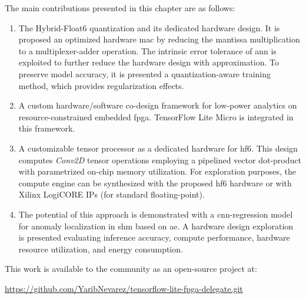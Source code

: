 The main contributions presented in this chapter are as follows:
\begin{enumerate}
	\item
	
	The Hybrid-Float6 quantization and its dedicated hardware design. It is proposed an optimized hardware \gls{mac} by reducing the mantissa multiplication to a multiplexer-adder operation. The intrinsic error tolerance of \gls{ann} is exploited to further reduce the hardware design with approximation. To preserve model accuracy, it is presented a quantization-aware training method, which provides regularization effects.
	
	\item A custom hardware/software co-design framework for low-power analytics on resource-constrained embedded \gls{fpga}. TensorFlow Lite Micro is integrated in this framework.
	\item A customizable tensor processor as a dedicated hardware for \gls{hf6}. This design computes \emph{Conv2D} tensor operations employing a pipelined vector dot-product with parametrized on-chip memory utilization. For exploration purposes, the compute engine can be synthesized with the proposed \gls{hf6} hardware or with Xilinx LogiCORE IPs (for standard floating-point).
	\item The potential of this approach is demonstrated with a \gls{cnn}-regression model for anomaly localization in \gls{shm} based on \gls{ae}. A hardware design exploration is presented evaluating inference accuracy, compute performance, hardware resource utilization, and energy consumption.
\end{enumerate}

This work is available to the community as an open-source project at:

\url{https://github.com/YaribNevarez/tensorflow-lite-fpga-delegate.git}
